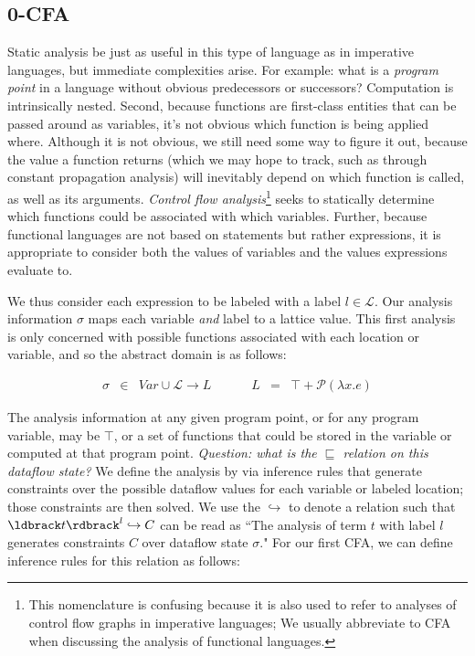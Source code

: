 \documentclass[11pt]{article}
\newcommand{\parg}[1] %
  {\ldbrack #1 \rdbrack}
\begin{document}
\subsection{0-CFA}

Static analysis be just as useful in this type of language as in imperative languages, but immediate complexities arise.  For example: what is a \emph{program point} in a language without obvious predecessors or successors? Computation is intrinsically nested. Second, because functions are first-class entities that can be passed around as variables, it's not obvious which function is being applied where.  Although it is not obvious, we still need some way to figure it out, because the value a function returns (which we may hope to track, such as through constant propagation analysis) will inevitably depend on which function is called, as well as its arguments.   
%
\emph{Control flow analysis}\footnote{This nomenclature is confusing because it is also used to refer to analyses of control flow graphs in imperative languages; We usually abbreviate to CFA when discussing the analysis of functional languages.}  seeks to statically determine which functions could be associated with which variables.  Further, because functional languages are not based on statements but rather expressions, it is appropriate to consider both the values of variables and the values expressions evaluate to.  

We thus consider each expression to be labeled with a label $l \in \mathcal{L}$.  Our analysis information $\sigma$ maps each variable \emph{and} label to a lattice value.  This first analysis is only concerned with possible functions associated with each location or variable, and so the abstract domain is as follows:


\[
\begin{array}{lllllll}
 \sigma & \in & \textit{Var} \cup \mathcal{L} \rightarrow L & ~~~~~~~ & L & = & \top + \mathcal{P}(\lambda x . e)
\end{array}
\]

The analysis information at any given program point, or for any program variable, may be $\top$, or a set of functions that could be stored in the variable or computed at that program point.  \emph{Question: what is the $\sqsubseteq$ relation on this dataflow state?}
%
We define the analysis by via inference rules that generate constraints over the possible dataflow values for each variable or labeled location; those constraints are then solved. 
We use the $\hookrightarrow$ to denote a relation such that $\parg{t}^l \hookrightarrow C$ can be read as ``The analysis of term $t$ with label $l$ generates constraints $C$ over dataflow state $\sigma$."  For our first CFA, we can define inference rules for this relation as follows:
\end{document}
